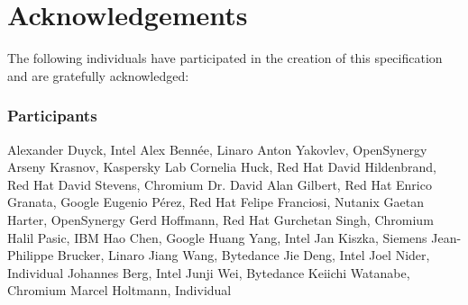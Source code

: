 \chapter{Acknowledgements}\label{chap:Acknowledgements}

The following individuals have participated in the creation of this specification and are gratefully acknowledged:

\subsection*{Participants}
Alexander Duyck, Intel \newline
Alex Bennée, Linaro \newline
Anton Yakovlev, OpenSynergy \newline
Arseny Krasnov, Kaspersky Lab \newline
Cornelia Huck, Red Hat \newline
David Hildenbrand, Red Hat \newline
David Stevens, Chromium \newline
Dr. David Alan Gilbert, Red Hat \newline
Enrico Granata, Google \newline
Eugenio Pérez, Red Hat \newline
Felipe Franciosi, Nutanix \newline
Gaetan Harter, OpenSynergy \newline
Gerd Hoffmann, Red Hat \newline
Gurchetan Singh, Chromium \newline
Halil Pasic, IBM \newline
Hao Chen, Google \newline
Huang Yang, Intel \newline
Jan Kiszka, Siemens \newline
Jean-Philippe Brucker, Linaro \newline
Jiang Wang, Bytedance \newline
Jie Deng, Intel \newline
Joel Nider, Individual \newline
Johannes Berg, Intel \newline
Junji Wei, Bytedance \newline
Keiichi Watanabe, Chromium \newline
Marcel Holtmann, Individual \newline
